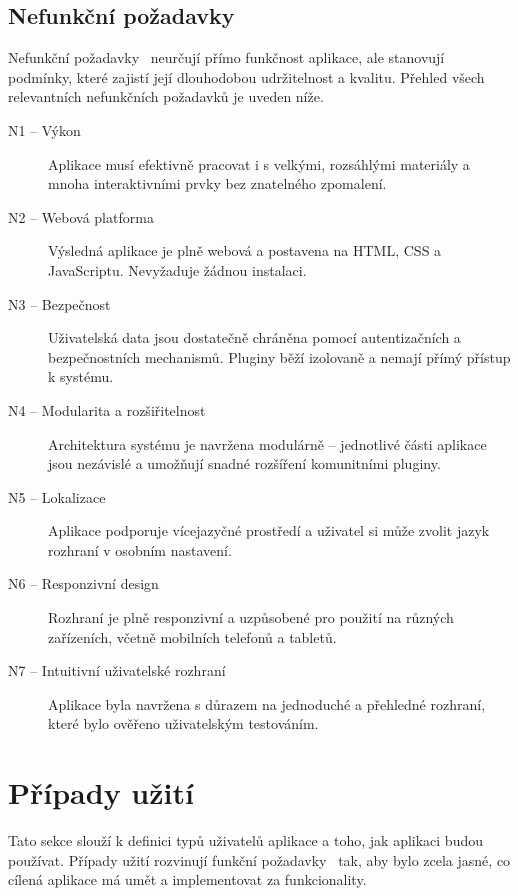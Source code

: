 \subsection{Nefunkční požadavky}
Nefunkční požadavky~\cite{uml_2007} neurčují přímo funkčnost aplikace, ale stanovují podmínky, které zajistí její dlouhodobou udržitelnost a kvalitu. 
Přehled všech relevantních nefunkčních požadavků je uveden níže.


\begin{description}
    \item[N1 -- Výkon]
    Aplikace musí efektivně pracovat i s velkými, rozsáhlými materiály a mnoha interaktivními prvky bez znatelného zpomalení.

    \item[N2 -- Webová platforma]
    Výsledná aplikace je plně webová a postavena na HTML, CSS a JavaScriptu. Nevyžaduje žádnou instalaci.

    \item[N3 -- Bezpečnost]
    Uživatelská data jsou dostatečně chráněna pomocí autentizačních a bezpečnostních mechanismů. Pluginy běží izolovaně a nemají přímý přístup k systému.

    \item[N4 -- Modularita a rozšiřitelnost]
    Architektura systému je navržena modulárně -- jednotlivé části aplikace jsou nezávislé a umožňují snadné rozšíření komunitními pluginy.

    \item[N5 -- Lokalizace]
    Aplikace podporuje vícejazyčné prostředí a uživatel si může zvolit jazyk rozhraní v osobním nastavení.

    \item[N6 -- Responzivní design]
    Rozhraní je plně responzivní a uzpůsobené pro použití na různých zařízeních, včetně mobilních telefonů a tabletů.

    \item[N7 -- Intuitivní uživatelské rozhraní]
    Aplikace byla navržena s důrazem na jednoduché a přehledné rozhraní, které bylo ověřeno uživatelským testováním.

\end{description}


\section{Případy užití}\label{chapter:analyza/uzivatelskePripady}

Tato sekce slouží k definici typů uživatelů aplikace a toho, jak aplikaci budou používat.
Případy užití rozvinují funkční požadavky~\cite{uml_2007} tak, aby bylo zcela jasné, co cílená aplikace má umět a implementovat za funkcionality.

